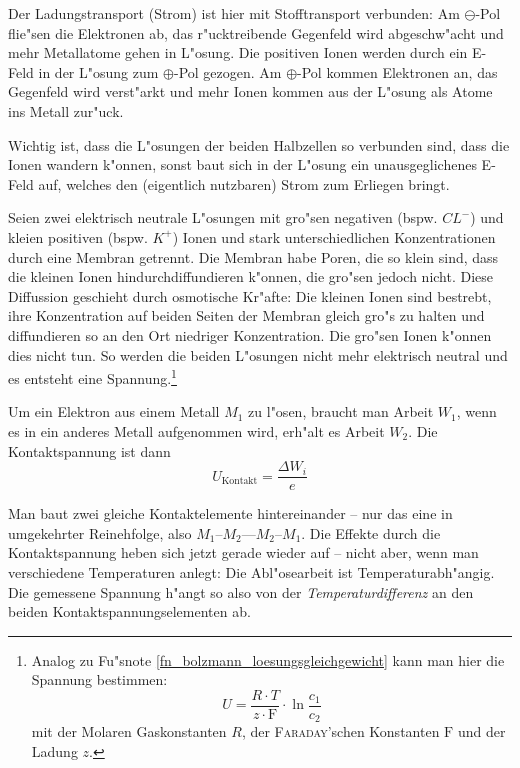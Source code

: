 \begin{description}[\setlabelstyle{\bfseries\slshape}]
   Der Ladungstransport (Strom) ist hier mit Stofftransport verbunden:
   Am $\ominus$-Pol flie"sen die Elektronen ab, das r"ucktreibende
   Gegenfeld wird abgeschw"acht und mehr Metallatome gehen in
   L"osung. Die positiven Ionen werden durch ein E-Feld in der L"osung
   zum $\oplus$-Pol gezogen. Am $\oplus$-Pol kommen Elektronen an, das
   Gegenfeld wird verst"arkt und mehr Ionen kommen aus der L"osung als
   Atome ins Metall zur"uck.

   Wichtig ist, dass die L"osungen der beiden Halbzellen so verbunden
   sind, dass die Ionen wandern k"onnen, sonst baut sich in der L"osung
   ein unausgeglichenes E-Feld auf, welches den (eigentlich nutzbaren)
   Strom zum Erliegen bringt.

\item[\index{Membranspannung}Membranspannung] Seien zwei elektrisch
   neutrale L"osungen mit gro"sen negativen (bspw. $CL^-$) und kleien
   positiven (bspw. $K^+$) Ionen und stark unterschiedlichen
   Konzentrationen durch eine Membran getrennt. Die Membran habe
   Poren, die so klein sind, dass die kleinen Ionen
   hindurchdiffundieren k"onnen, die gro"sen jedoch nicht. Diese
   Diffussion geschieht durch osmotische Kr"afte: Die
   kleinen Ionen sind bestrebt, ihre Konzentration auf beiden Seiten
   der Membran gleich gro"s zu halten und diffundieren so an den Ort
   niedriger Konzentration. Die gro"sen Ionen k"onnen dies nicht tun. So
   werden die beiden L"osungen nicht mehr elektrisch neutral und es
   entsteht eine Spannung.\footnote{Analog zu Fu"snote
     \ref{fn_bolzmann_loesungsgleichgewicht} kann man hier die
     Spannung bestimmen:
     \begin{equation*}
        U = \frac{R \cdot T}{z \cdot \mathrm F} \cdot \ln \frac{c_1}{c_2}
     \end{equation*}
     mit der Molaren Gaskonstanten $R$, der \textsc{Faraday}'schen
     Konstanten $\mathrm F$ und der Ladung $z$.  }
\item[Kontaktspannung]
   Um ein Elektron aus einem Metall $M_1$ zu l"osen, braucht man Arbeit
   $W_1$, wenn es in ein anderes Metall aufgenommen wird, erh"alt es
   Arbeit $W_2$. Die Kontaktspannung ist dann
   \begin{equation}
      \label{eqn_differenz-c86}
      U_\text{Kontakt} = \frac{\Delta W_i}{e}
   \end{equation}

\item[Thermospannung]  Man baut zwei gleiche
   Kontaktelemente hintereinander -- nur das eine in umgekehrter
   Reinehfolge, also $M_1$--$M_2$---$M_2$--$M_1$. Die Effekte durch
   die Kontaktspannung heben sich jetzt gerade wieder auf -- nicht
   aber, wenn man verschiedene Temperaturen anlegt: Die Abl"osearbeit
   ist Temperaturabh"angig. Die gemessene Spannung h"angt so also von
   der \emph{Temperaturdifferenz} an den beiden
   Kontaktspannungselementen ab.


\end{description}
